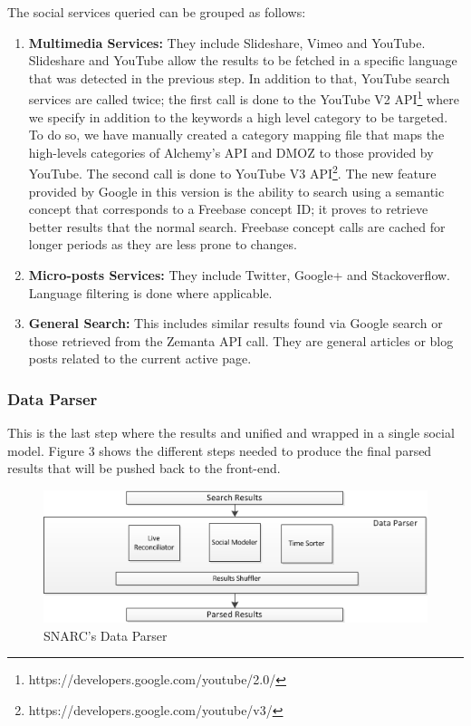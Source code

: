 \documentclass[onecolumn, crcready]{iosart2c}
\begin{document}
The social services queried can be grouped as follows:
\begin{enumerate}
\item {\bf Multimedia Services:} They include Slideshare, Vimeo and YouTube. Slideshare and YouTube allow the results to be fetched in a specific language that was detected in the previous step. In addition to that, YouTube search services are called twice; the first call is done to the YouTube V2 API\footnote{https://developers.google.com/youtube/2.0/} where we specify in addition to the keywords a high level category to be targeted. To do so, we have manually created a category mapping file that maps the high-levels categories of Alchemy’s API and DMOZ to those provided by YouTube. The second call is done to YouTube V3 API\footnote{https://developers.google.com/youtube/v3/}. The new feature provided by Google in this version is the ability to search using a semantic concept that corresponds to a Freebase concept ID; it proves to retrieve better results that the normal search. Freebase concept calls are cached for longer periods as they are less prone to changes. 
\item {\bf Micro-posts Services:} They include Twitter, Google+ and Stackoverflow. Language filtering is done where applicable. 
\item {\bf General Search:} This includes similar results found via Google search or those retrieved from the Zemanta API call. They are general articles or blog posts related to the current active page.
\end{enumerate}
\subsubsection{Data Parser}
This is the last step where the results and unified and wrapped in a single social model. Figure 3 shows the different steps needed to produce the final parsed results that will be pushed back to the front-end.
\begin{figure}[ht!]
  \centering
    \includegraphics[scale=0.8]{architecture-part3.png} 
  \caption{SNARC's Data Parser}
\end{figure}
\end{document}
